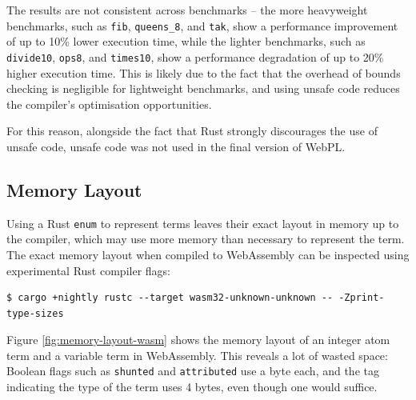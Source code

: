The results are not consistent across benchmarks -- the more heavyweight benchmarks, such as \texttt{fib}, \texttt{queens\_8}, and \texttt{tak}, show a performance improvement of up to 10\% lower execution time, while the lighter benchmarks, such as \texttt{divide10}, \texttt{ops8}, and \texttt{times10}, show a performance degradation of up to 20\% higher execution time. This is likely due to the fact that the overhead of bounds checking is negligible for lightweight benchmarks, and using unsafe code reduces the compiler's optimisation opportunities.

For this reason, alongside the fact that Rust strongly discourages the use of unsafe code, unsafe code was not used in the final version of WebPL.

\subsection{Memory Layout}

Using a Rust \texttt{enum} to represent terms leaves their exact layout in memory up to the compiler, which may use more memory than necessary to represent the term. The exact memory layout when compiled to WebAssembly can be inspected using experimental Rust compiler flags:

\begin{verbatim}
$ cargo +nightly rustc --target wasm32-unknown-unknown -- -Zprint-type-sizes
\end{verbatim}

Figure \ref{fig:memory-layout-wasm} shows the memory layout of an integer atom term and a variable term in WebAssembly. This reveals a lot of wasted space: Boolean flags such as \texttt{shunted} and \texttt{attributed} use a byte each, and the tag indicating the type of the term uses 4 bytes, even though one would suffice.

